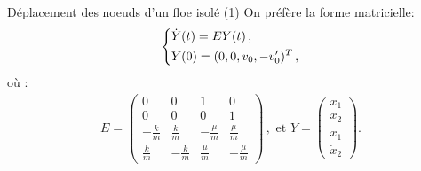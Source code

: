 \begin{frame}{Déplacement des noeuds d’un floe isolé (1)}
{{            On préfère la forme matricielle:
            \begingroup
            \color{red}
            \begin{align*}
                \begin{dcases}
                    \dot{Y}(t)= E Y(t) \,,\\
                    Y(0) = (0,0,v_0,-v'_0)^T \,,
                \end{dcases}
            \end{align*}
            \endgroup
            où :
            \begin{align*}
                E = \begin{pmatrix}
                    0 & 0 & 1 & 0 \\ 0 & 0& 0& 1 \\ -\frac{k}{m} & \frac{k}{m} & -\frac{\mu}{m} & \frac{\mu}{m} \\ \frac{k}{m} & -\frac{k}{m} & \frac{\mu}{m} & -\frac{\mu}{m}
                \end{pmatrix} \,,
                \text{ et } Y = \begin{pmatrix} x_1 \\ x_2 \\ \dot{x}_1 \\ \dot{x}_2 \end{pmatrix}.
            \end{align*}
        }
    }

    
\end{frame}


